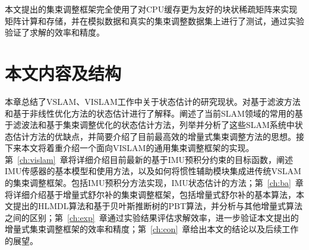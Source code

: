 本文提出的集束调整框架完全使用了对CPU缓存更为友好的块状稀疏矩阵来实现矩阵计算和存储，并在模拟数据和真实的集束调整数据集上进行了测试，通过实验验证了求解的效率和精度。




\section{本文内容及结构}

本章总结了VSLAM、VISLAM工作中关于状态估计的研究现状。对基于滤波方法和基于非线性优化方法的状态估计进行了解释。阐述了当前SLAM领域的常用的基于滤波法和基于集束调整优化的状态估计方法，列举并分析了这些SLAM系统中状态估计方法的优缺点，并简要介绍了目前最高效的增量式集束调整方法的思想。接下来本文将着重介绍一个面向VISLAM的通用集束调整框架的实现。第~\ref{ch:vislam}~章将详细介绍目前最新的基于IMU预积分约束的目标函数，阐述IMU传感器的基本模型和使用方法，以及如何将惯性辅助模块集成进传统VSLAM的集束调整框架。包括IMU预积分方法实现，IMU状态估计的方法；第~\ref{ch:ba}~章将详细介绍基于增量式舒尔补的集束调整框架，包括增量式舒尔补的基本算法，本文提出的HLMDL算法和基于贝叶斯推断树的PBT算法，并分析与其他增量式算法之间的区别；第~\ref{ch:exp}~章通过实验结果评估求解效率，进一步验证本文提出的增量式集束调整框架的效率和精度；第~\ref{ch:con}~章给出本文的结论以及后续工作的展望。
